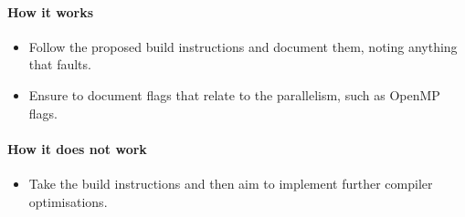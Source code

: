 \paragraph*{How it works}

\begin{itemize}[noitemsep]
  \item[$\boxplus$] Follow the proposed build instructions and document them, noting anything that faults.
  \item[$\boxplus$] Ensure to document flags that relate to the parallelism, such as OpenMP flags.
\end{itemize}

\paragraph*{How it does not work}

\begin{itemize}[noitemsep]
  \item[$\boxminus$] Take the build instructions and then aim to implement further compiler optimisations.
\end{itemize}
